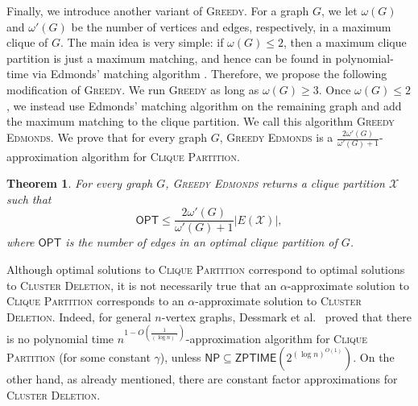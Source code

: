 \documentclass[a4paper,fleqn]{cas-sc}
\newtheorem{thm}{Theorem}[section]
\theoremstyle{remark}
\theoremstyle{plain}
\newcommand{\cd}{\textsc{Cluster Deletion}}
\newcommand{\cp}{\textsc{Clique Partition}}
\newcommand{\greedy}{{\textsc{Greedy}}}
\newcommand{\edmonds}{{\textsc{Greedy Edmonds}}}
\newcommand{\opt}{{\mathsf{OPT}}}
\begin{document}
 Finally, we introduce another variant of \greedy{}.  For a graph $G$, we let $\omega(G)$ and $\omega'(G)$ be the number of vertices and edges, respectively, in a maximum clique of $G$.  The main idea is very simple: if $\omega(G) \leq 2$, then a maximum clique partition is just a maximum matching, and hence can be found in polynomial-time via Edmonds' matching algorithm \cite{Edmonds_1965}.  Therefore, we propose the following modification of \greedy.  We run \greedy{} as long as $\omega(G) \geq 3$.  Once $\omega(G) \leq 2$, we instead use Edmonds' matching algorithm on the remaining graph and add the maximum matching to the clique partition.  We call this algorithm \edmonds{}. We prove that for every graph $G$, \edmonds{} is a $\frac{2\omega'(G)}{\omega'(G)+1}$-approximation algorithm for \cp.

 \begin{thm} \label{thm:main-summary}
    For every graph $G$, \edmonds{} returns a clique partition $\mathcal{X}$ such that \[\opt \leq \frac{2\omega'(G)}{\omega'(G)+1}|E(\mathcal{X})|,\] where $\opt$ is the number of edges in an optimal clique partition of $G$. 
\end{thm}




Although optimal solutions to \cp{} correspond to optimal solutions to \cd, it is not necessarily true that an $\alpha$-approximate solution to \cp{} corresponds to an $\alpha$-approximate solution to \cd. Indeed, for general $n$-vertex graphs, Dessmark et al.~\cite{DESSMARK2007} proved that there is no polynomial time $n^{1-O(\frac{1}{(\log n)^\gamma})}$-approximation algorithm for \cp{} (for some constant $\gamma$), unless $\mathsf{NP} \subseteq \mathsf{ZPTIME}(2^{(\log n)^{O(1)}})$.  On the other hand, as already mentioned, there are constant factor approximations for \cd.  
\end{document}

